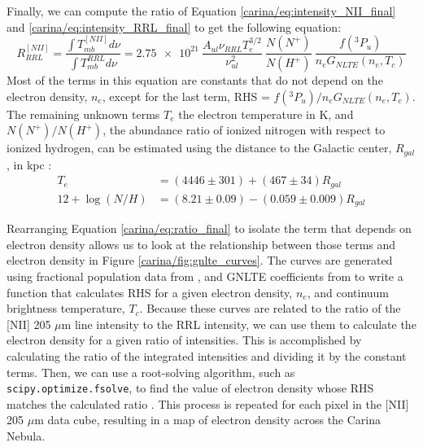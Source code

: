 Finally, we can compute the ratio of Equation \ref{carina/eq:intensity_NII_final} and \ref{carina/eq:intensity_RRL_final} to get the following equation:
\begin{equation}
    R^{[NII]}_{RRL} = \frac{\int{T^{[NII]}_{mb} d\nu}}{\int{T^{RRL}_{mb} d\nu}} = \num{2.75e21}\ \frac{A_{ul}\nu_{RRL}T_e^{3/2}}{\nu_{ul}^2}\ \frac{N(N^+)}{N(H^+)}\ \frac{f(^3P_u)}{n_e G_{NLTE}(n_e,T_c)}
    \label{carina/eq:ratio_final}
\end{equation}
Most of the terms in this equation are constants that do not depend on the electron density, $n_e$, except for the last term, RHS = $f(^3P_u)/n_e G_{NLTE}(n_e, T_c)$.
The remaining unknown terms $T_e$ the electron temperature in K, and $N(N^+)/N(H^+)$, the abundance ratio of ionized nitrogen with respect to ionized hydrogen, can be estimated using the distance to the Galactic center, $R_{gal}$, in kpc \parencite{pineda2019electron, balser2015azimuthal, esteban2018revisiting}:
\begin{align}
    T_e &= (4446 \pm 301) + (467 \pm 34) R_{gal} \\
    12 + \log(N/H) &= (8.21 \pm 0.09) - (0.059 \pm 0.009) R_{gal}
\end{align}

Rearranging Equation \ref{carina/eq:ratio_final} to isolate the term that depends on electron density allows us to look at the relationship between those terms and electron density in Figure \ref{carina/fig:gnlte_curves}.
The curves are generated using fractional population data from \cite{luridiana2015pyneb}, and GNLTE coefficients from \cite{gordon2002radio} to write a function that calculates RHS for a given electron density, $n_e$, and continuum brightness temperature, $T_c$.
Because these curves are related to the ratio of the [NII] 205 $\mu$m line intensity to the RRL intensity, we can use them to calculate the electron density for a given ratio of intensities.
This is accomplished by calculating the ratio of the integrated intensities and dividing it by the constant terms. 
Then, we can use a root-solving algorithm, such as \texttt{scipy.optimize.fsolve}, to find the value of electron density whose RHS matches the calculated ratio \parencite{2020SciPy-NMeth}.
This process is repeated for each pixel in the [NII] 205 $\mu$m data cube, resulting in a map of electron density across the Carina Nebula.

